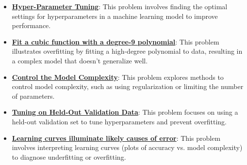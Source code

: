 \documentclass{article}%
\begin{document}
\begin{itemize}[leftmargin=*]
\item \href{https://purdue.brightspace.com/d2l/common/assets/pdfjs-d2l-dist/1.0.14-legacy/web/viewer.html?file=\%2Fcontent\%2Fenforced\%2F1095467-wl.202510.CS.24300.001\%2F10L1-CrossValidation.pdf\%3Fou\%3D1095467\&lang=en-us\&container=d2l-fileviewer-rendered-pdf\&fullscreen=d2l-fileviewer-rendered-pdf-dialog\&height=667#page=14}{\textbf{Hyper{-}Parameter Tuning}}: This problem involves finding the optimal settings for hyperparameters in a machine learning model to improve performance.%
\item \href{https://purdue.brightspace.com/d2l/common/assets/pdfjs-d2l-dist/1.0.14-legacy/web/viewer.html?file=\%2Fcontent\%2Fenforced\%2F1095467-wl.202510.CS.24300.001\%2F10L1-CrossValidation.pdf\%3Fou\%3D1095467\&lang=en-us\&container=d2l-fileviewer-rendered-pdf\&fullscreen=d2l-fileviewer-rendered-pdf-dialog\&height=667#page=15}{\textbf{Fit a cubic function with a degree{-}9 polynomial}}: This problem illustrates overfitting by fitting a high-degree polynomial to data, resulting in a complex model that doesn't generalize well.%
\item \href{https://purdue.brightspace.com/d2l/common/assets/pdfjs-d2l-dist/1.0.14-legacy/web/viewer.html?file=\%2Fcontent\%2Fenforced\%2F1095467-wl.202510.CS.24300.001\%2F10L1-CrossValidation.pdf\%3Fou\%3D1095467\&lang=en-us\&container=d2l-fileviewer-rendered-pdf\&fullscreen=d2l-fileviewer-rendered-pdf-dialog\&height=667#page=16}{\textbf{Control the Model Complexity}}: This problem explores methods to control model complexity, such as using regularization or limiting the number of parameters.%
\item \href{https://purdue.brightspace.com/d2l/common/assets/pdfjs-d2l-dist/1.0.14-legacy/web/viewer.html?file=\%2Fcontent\%2Fenforced\%2F1095467-wl.202510.CS.24300.001\%2F10L1-CrossValidation.pdf\%3Fou\%3D1095467\&lang=en-us\&container=d2l-fileviewer-rendered-pdf\&fullscreen=d2l-fileviewer-rendered-pdf-dialog\&height=667#page=19}{\textbf{Tuning on Held{-}Out Validation Data}}: This problem focuses on using a held-out validation set to tune hyperparameters and prevent overfitting.%
\item \href{https://purdue.brightspace.com/d2l/common/assets/pdfjs-d2l-dist/1.0.14-legacy/web/viewer.html?file=\%2Fcontent\%2Fenforced\%2F1095467-wl.202510.CS.24300.001\%2F10L1-CrossValidation.pdf\%3Fou\%3D1095467\&lang=en-us\&container=d2l-fileviewer-rendered-pdf\&fullscreen=d2l-fileviewer-rendered-pdf-dialog\&height=667#page=20}{\textbf{Learning curves illuminate likely causes of error}}: This problem involves interpreting learning curves (plots of accuracy vs. model complexity) to diagnose underfitting or overfitting.%

\end{itemize}
\end{document}
